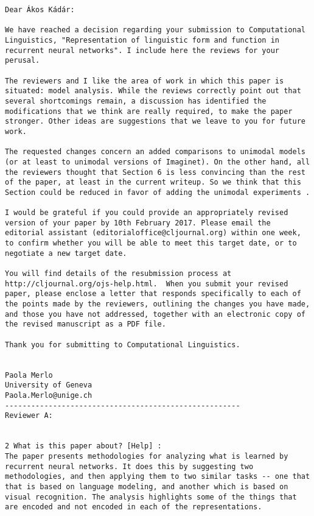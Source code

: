 \begin{verbatim}
Dear Ákos Kádár:

We have reached a decision regarding your submission to Computational
Linguistics, "Representation of linguistic form and function in
recurrent neural networks". I include here the reviews for your
perusal.

The reviewers and I like the area of work in which this paper is
situated: model analysis. While the reviews correctly point out that
several shortcomings remain, a discussion has identified the
modifications that we think are really required, to make the paper
stronger. Other ideas are suggestions that we leave to you for future
work.

The requested changes concern an added comparisons to unimodal models
(or at least to unimodal versions of Imaginet). On the other hand, all
the reviewers thought that Section 6 is less convincing than the rest
of the paper, at least in the current writeup. So we think that this
Section could be reduced in favor of adding the unimodal experiments .

I would be grateful if you could provide an appropriately revised
version of your paper by 10th February 2017. Please email the
editorial assistant (editorialoffice@cljournal.org) within one week,
to confirm whether you will be able to meet this target date, or to
negotiate a new target date.

You will find details of the resubmission process at
http://cljournal.org/ojs-help.html.  When you submit your revised
paper, please enclose a letter that responds specifically to each of
the points made by the reviewers, outlining the changes you have made,
and those you have not addressed, together with an electronic copy of
the revised manuscript as a PDF file.

Thank you for submitting to Computational Linguistics.


Paola Merlo
University of Geneva
Paola.Merlo@unige.ch
------------------------------------------------------
Reviewer A:


2 What is this paper about? [Help] :
The paper presents methodologies for analyzing what is learned by
recurrent neural networks. It does this by suggesting two
methodologies, and then applying them to two similar tasks -- one that
that is based on language modeling, and another which is based on
visual recognition. The analysis highlights some of the things that
are encoded and not encoded in each of the representations.



\end{verbatim}
